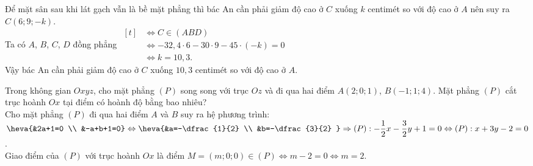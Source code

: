 \begin{bt}
{		Để mặt sân sau khi lát gạch vẫn là bề mặt phẳng thì bác An cần phải giảm độ cao ở $C$ xuống $k$ centimét so với độ cao ở $A$ nên suy ra $C(6; 9; -k)$.\\
		Ta có $A$, $B$, $C$, $D$ đồng phẳng	$\begin{aligned}[t]
			&\Leftrightarrow C \in (ABD)\\
			&\Leftrightarrow -32{,}4\cdot 6 -30 \cdot 9 -45\cdot (-k)=0\\
			&\Leftrightarrow k=10{,}3.
		\end{aligned}$\\
		Vậy bác An cần phải giảm độ cao ở $C$ xuống $10{,}3$ centimét so với độ cao ở $A$.
	}
\end{bt}

\begin{bt}%
  
	Trong không gian $Oxyz$, cho mặt phẳng $(P)$ song song với trục $Oz$ và đi qua hai điểm $A(2; 0; 1)$, $B(-1; 1; 4)$. Mặt phẳng $(P)$ cắt trục hoành $Ox$ tại điểm có hoành độ bằng bao nhiêu?
		\\
		 Cho mặt phẳng $(P)$ đi qua hai điểm $A$ và $B$ suy ra hệ phương trình:\\
		 $\heva{&2a+1=0 \\ &-a+b+1=0} \Leftrightarrow \heva{&a=-\dfrac{1}{2} \\ &b=-\dfrac{3}{2} }\Rightarrow (P): -\dfrac{1}{2}x-\dfrac{3}{2}y+1=0 \Leftrightarrow (P): x+3y-2=0$.\\
		 Giao điểm của $(P)$ với trục hoành $Ox$ là điểm $M=(m;0;0) \in (P) \Leftrightarrow m-2=0 \Leftrightarrow m=2$.

\end{bt}

